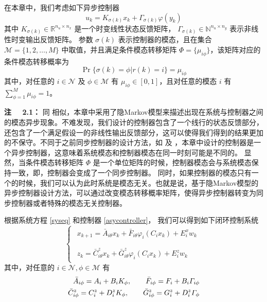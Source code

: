 	在本章中，我们考虑如下异步控制器
	\begin{equation}\label{asycontroller}
	u_k=K_{\sigma(k)}x_k+\varGamma_{\sigma(k)}\varphi(y_k) 
	\end{equation}
	其中 $K_{\sigma(k)}\in \mathbb{R}^{n_u\times n_x}$ 是一个时变线性状态反馈矩阵， $\varGamma_{\sigma(k)}\in \mathbb{N}^{n_u\times n_y}$ 表示非线性时变输出反馈矩阵。 参数 $\sigma(k)$ 表示控制器的模态，且在集合  $\mathcal{M}=\{1,2,\dots,M\}$ 中取值，并且满足条件模态转移矩阵 $\varPhi=\{\mu_{i\phi} \}$，该矩阵对应的条件模态转移概率为
	\begin{equation}
	\Pr\{\sigma(k)=\phi|r(k)=i\}=\mu_{i\phi}
	\end{equation}
	其中，对任意的 $i\in\mathcal{N}$ 及 $\phi\in\mathcal{M}$ 有 $\mu_{i\phi}\in [0,1]$，且对任意的模态 $i$ 有 $\sum_{\phi=1}^{M}\mu_{i\phi}=1$。
	
	{\bf 注 \ \ 2.1：} 
	同 \cite{passive_wu} 相似，本章中采用了隐Markov模型来描述出现在系统与控制器之间的模态异步现象。不难发现，我们设计的控制器包含了一个线行的状态反馈部分，还包含了一个满足假设一的非线性输出反馈部分，这可以使得我们得到的结果更加的不保守。不同于之前同步控制器的设计方法，如\cite{song_control} 及 \cite{costaolv_control_1}，本章中设计的控制器是一个异步控制器，这意味着系统模态和控制器模态在同一时刻可能是不同的。 显然，当条件模态转移矩阵 $\varPhi$ 是一个单位矩阵的时候，控制器模态会与系统模态保持一致，即，控制器会变成了一个同步控制器。 同时，如果控制器的模态只有一个的时候，我们可以认为此时系统是模态无关。也就是说，基于隐Markov模型的异步控制器设计方法，可以通过改变模态转移概率矩阵，使得异步控制器转变为同步控制器或者特殊的模态无关控制器。
	
	根据系统方程 \eqref{syseq} 和控制器 \eqref{asycontroller}， 我们可以得到如下闭环控制系统
	\begin{equation}\label{close_system_equation_2}
	\left\{
	\begin{array}{lr}
	\begin{split}
	x_{k+1}=\bar{A}_{i\theta}x_k+\bar{F}_{i\theta}\varphi_{i}(C_ix_k)+E_i^xw_k\\
	\end{split}
	\\
	\begin{split}
	z_k=\bar{C}^{z}_{i\theta}x_k+\bar{G}^{z}_{i\theta}\varphi_{i}(C_ix_k)+E^z_iw_k
	\end{split}
	\end{array}
	\right.
	\end{equation} 
	其中，对任意的 $i \in \mathcal{N}, \phi \in \mathcal{M}$ 有
	\begin{equation} \notag
	\begin{aligned}
	\bar{A}_{i\phi}=A_{i}+B_{i}K_{\phi},  \qquad \bar{F}_{i\phi}=F_{i}+B_{i}\varGamma_{i\phi} \\
	\bar{C}^{z}_{i\phi}=C^{z}_{i}+D^{z}_{i}K_{\phi}, \qquad \bar{G}^{z}_{i\phi}=G^{z}_{i}+D^{z}_{i}\varGamma_{\phi}
	\end{aligned}
	\end{equation}
	

